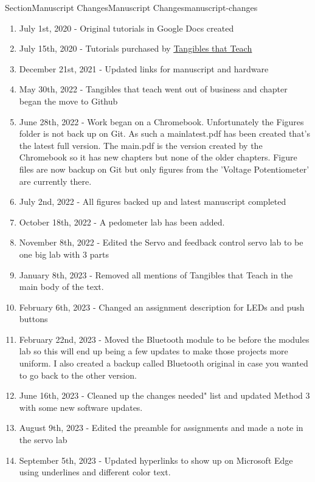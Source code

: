 \documentclass[oneside,10pt,]{book}
\newcommand{\linkhilite}[1]{\underline{#1}}
\numberwithin{equation}{section}
\begin{document}
\begin{sectionptx}{Section}{Manuscript Changes}{}{Manuscript Changes}{}{}{manuscript-changes}
%
\begin{enumerate}
\item{}July 1st, 2020 - Original tutorials in Google Docs created%
\item{}July 15th, 2020 - Tutorials purchased by \href{https://tangibles-that-teach.gitbook.io/instrumentation-lab-manual/-MbMx70LQzRmEG_hS7Ld/}{\linkhilite{Tangibles that Teach}}%
\item{}December 21st, 2021 - Updated links for manuscript and hardware%
\item{}May 30th, 2022 - Tangibles that teach went out of business and chapter began the move to Github%
\item{}June 28th, 2022 - Work began on a Chromebook. Unfortunately the Figures folder is not back up on Git. As such a main\textunderscore{}latest.pdf has been created that's the latest full version. The main.pdf is the version created by the Chromebook so it has new chapters but none of the older chapters. Figure files are now backup on Git but only figures from the 'Voltage Potentiometer' are currently there.%
\item{}July 2nd, 2022 - All figures backed up and latest manuscript completed%
\item{}October 18th, 2022 - A pedometer lab has been added.%
\item{}November 8th, 2022 - Edited the Servo and feedback control servo lab to be one big lab with 3 parts%
\item{}January 8th, 2023 - Removed all mentions of Tangibles that Teach in the main body of the text.%
\item{}February 6th, 2023 - Changed an assignment description for LEDs and push buttons%
\item{}February 22nd, 2023 - Moved the Bluetooth module to be before the modules lab so this will end up being a few updates to make those projects more uniform. I also created a backup called Bluetooth original in case you wanted to go back to the other version.%
\item{}June 16th, 2023 - Cleaned up the \textasciigrave{}\textasciigrave{}changes needed" list and updated Method 3 with some new software updates.%
\item{}August 9th, 2023 - Edited the preamble for assignments and made a note in the servo lab%
\item{}September 5th, 2023 - Updated hyperlinks to show up on Microsoft Edge using underlines and different color text.%

\end{enumerate}
\end{sectionptx}
\end{document}
